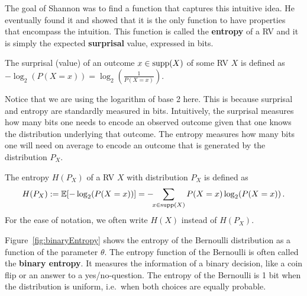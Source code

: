 The goal of Shannon was to find a function that captures this intuitive idea. He eventually found it and showed that it is the only function to have properties
that encompass the intuition. This function is called the
\textbf{entropy} of a RV and it is simply the expected
\textbf{surprisal} value, expressed in bits.

\begin{Definition}[Surprisal]
The surprisal (value) of an outcome $ x \in \operatorname{supp}(X) $ of some RV $ X
$ is defined as $ -\log_{2}(P(X=x)) = \log_2(\frac{1}{P(X=x)})$.
\end{Definition} 

Notice that we are using the logarithm of base 2 here. This is because surprisal and entropy are standardly measured in bits. Intuitively, the surprisal measures
how many bits one needs to encode an observed outcome given that one knows the distribution underlying that outcome. The entropy measures how many bits one
will need on average to encode an outcome that is generated by the distribution $ P_{X} $.

\begin{Definition}[Entropy]
The entropy $H(P_X)$ of a RV $ X $ with distribution $P_X$ is defined as 
$$H(P_X) := \mathbb{E}[-\log_{2}(P(X=x))] = - \!\! \sum_{x \in \operatorname{supp}(X)} P(X=x) \log_2(P(X=x)) \, .$$ 
For the ease of notation, we often write $H(X)$ instead of $H(P_X)$.
\end{Definition}

Figure~\ref{fig:binaryEntropy} shows the entropy of the Bernoulli distribution as a function of the
parameter $ \theta $. The entropy function of the Bernoulli is often called the \textbf{binary entropy}.
It measures the information of a binary decision, like a coin flip or an answer to a yes/no-question.
The entropy of the Bernoulli is 1 bit when the distribution is uniform, i.e.\ when both choices are equally 
probable. 

